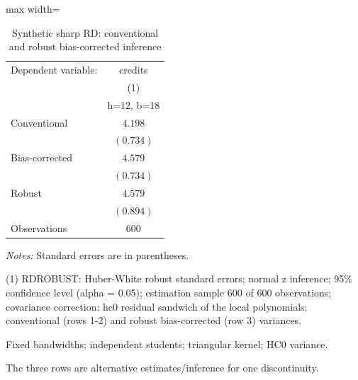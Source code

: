 \begin{table}[htbp]
\centering
\caption{Synthetic sharp RD: conventional and robust bias-corrected inference}
\begingroup
\small
\setlength{\tabcolsep}{6pt}
\renewcommand{\arraystretch}{1.12}
\begin{adjustbox}{max width=\linewidth}
\begin{tabular}{@{}lc@{}}
\toprule
Dependent variable: & credits \\
 & (1) \\
 & h=12, b=18 \\
\midrule
Conventional & $4.198$ \\
 & $(0.734)$ \\[0.35em]
Bias-corrected & $4.579$ \\
 & $(0.734)$ \\[0.35em]
Robust & $4.579$ \\
 & $(0.894)$ \\[0.35em]
\midrule
Observations & 600 \\
\bottomrule
\end{tabular}
\end{adjustbox}
\par\smallskip
\begin{minipage}{\linewidth}
\footnotesize
\raggedright
\textit{Notes:} Standard errors are in parentheses.\par
(1) RDROBUST: Huber-White robust standard errors; normal z inference; 95\% confidence level (alpha = 0.05); estimation sample 600 of 600 observations; covariance correction: hc0 residual sandwich of the local polynomials; conventional (rows 1-2) and robust bias-corrected (row 3) variances.\par
Fixed bandwidths; independent students; triangular kernel; HC0 variance.\par
The three rows are alternative estimates/inference for one discontinuity.\par
\end{minipage}
\endgroup
\end{table}
